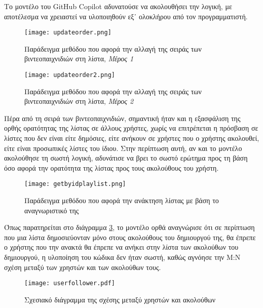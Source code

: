 Το μοντέλο του \textlatin{GitHub Copilot} αδυνατούσε να ακολουθήσει την
λογική, με αποτέλεσμα να χρειαστεί να υλοποιηθούν εξ᾽ ολοκλήρου από τον
προγραμματιστή.

\begin{figure}[H]
  \begin{center}
    \texttt{[image: updateorder.png]}
    \caption{Παράδειγμα μεθόδου που αφορά την αλλαγή της σειράς των
      βιντεοπαιχνιδιών στη λίστα, \textit{Μέρος 1}}
  \end{center}
  \label{fig:updateOrder}
\end{figure}

\begin{figure}[H]
  \begin{center}
    \texttt{[image: updateorder2.png]}
    \caption{Παράδειγμα μεθόδου που αφορά την αλλαγή της σειράς των
      βιντεοπαιχνιδιών στη λίστα, \textit{Μέρος 2}}
  \end{center}
  \label{fig:updateOrder2}
\end{figure}

Πέρα από τη σειρά των βιντεοπαιχνιδιών, σημαντική ήταν και η εξασφάλιση
της ορθής ορατότητας της λίστας σε άλλους χρήστες, χωρίς να επιτρέπεται
η πρόσβαση σε λίστες που δεν είναι είτε δημόσιες, είτε ανήκουν σε
χρήστες που ο χρήστης ακολουθεί, είτε είναι προσωπικές λίστες του ίδιου.
Στην περίπτωση αυτή, αν και το μοντέλο ακολούθησε τη σωστή λογική,
αδυνάτισε να βρει το σωστό ερώτημα προς τη βάση όσο αφορά την ορατότητα
της λίστας προς τους ακολούθους του χρήστη.

\begin{figure}[H]
  \begin{center}
    \texttt{[image: getbyidplaylist.png]}
    \caption{Παράδειγμα μεθόδου που αφορά την ανάκτηση λίστας με βάση το
      αναγνωριστικό της}
  \end{center}
  \label{fig:getByIdPlaylist}
\end{figure}

Όπως παρατηρείται στο διάγραμμα \ref{fig:getByIdPlaylist}, το μοντέλο
ορθά αναγνώρισε ότι σε περίπτωση που μια λίστα δημοσιεύονταν μόνο στους
ακολούθους του δημιουργού της, θα έπρεπε ο χρήστης που την ανακτά θα
έπρεπε να ανήκει στην λίστα των ακολούθων του δημιουργού, η υλοποίηση
του κώδικα δεν ήταν σωστή, καθώς αγνόησε την Μ:Ν σχέση μεταξύ των
χρηστών και των ακολούθων τους.

\begin{figure}[H]
  \begin{center}
    \texttt{[image: userfollower.pdf]}
    \caption{Σχεσιακό διάγραμμα της σχέσης μεταξύ χρηστών και ακολούθων}
  \end{center}
  \label{fig:userFollower}
\end{figure}

